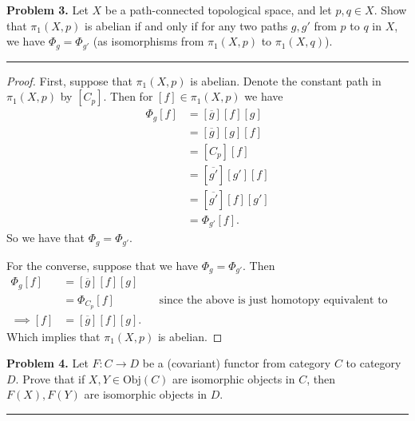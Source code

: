 \documentclass[leqno]{article}
\theoremstyle{nonumberplain}
\newtheorem{proof}{Proof}
\newcommand{\obj}{\ensuremath{\mathrm{Obj}}}
\begin{document}
\noindent\textbf{Problem 3.} Let $X$ be a path-connected topological space, and let $p,q\in X$. Show that $\pi_1(X,p)$ is abelian if and only if for any two paths $g,g'$ from $p$ to $q$ in $X$, we have $\Phi_g=\Phi_{g'}$ (as isomorphisms from $\pi_1(X,p)$ to $\pi_1(X,q)$). 

\noindent\rule[0.5ex]{\linewidth}{1pt}

\begin{proof} 
First, suppose that $\pi_1 (X,p)$ is abelian.  Denote the constant path in $\pi_1 (X,p)$ by $[C_p]$. Then for $[f]\in \pi_1 (X,p)$ we have
\begin{align*}
\Phi_g [f] &= [\overline{g}] [f] [g]\\
&= [\overline{g}][g][f]\\
&= [C_p][f]\\
&= [\overline{g'}][g'][f]\\
&= [\overline{g'}][f][g']\\
&= \Phi_{g'} [f].
\end{align*}
So we have that $\Phi_g = \Phi_{g'}$.

For the converse, suppose that we have $\Phi_g = \Phi_{g'}$. Then
\begin{align*}
\Phi_g [f] &= [\overline{g}][f][g]\\
&= \Phi_{C_p} [f] && \textrm{since the above is just homotopy equivalent to this}\\
\implies [f]&=[\overline{g}][f][g].
\end{align*}
Which implies that $\pi_1 (X,p)$ is abelian.
\end{proof}


\pagebreak





\noindent\textbf{Problem 4.} Let $F\colon C\to D$ be a (covariant) functor from category $C$ to category $D$. Prove that if $X,Y\in\obj(C)$ are isomorphic objects in $C$, then $F(X),F(Y)$ are isomorphic objects in $D$. 

\noindent\rule[0.5ex]{\linewidth}{1pt}
\end{document}
